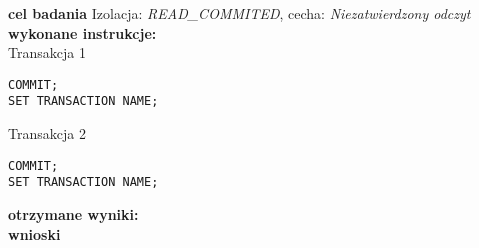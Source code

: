 \documentclass[11pt,oneside, a4paper]{article}
\title{}
\date{}
\begin{document}
\justify
\textbf{cel badania} Izolacja:
\textit{READ\_COMMITED}, cecha:
\textit{Niezatwierdzony odczyt} \\
\textbf{wykonane instrukcje: } \\
Transakcja 1
\begin{lstlisting}
COMMIT;
SET TRANSACTION NAME;
\end{lstlisting}
Transakcja 2
\begin{lstlisting}
COMMIT;
SET TRANSACTION NAME;
\end{lstlisting}

\textbf{otrzymane wyniki: } \\
\textbf{wnioski} \\
\end{document}
